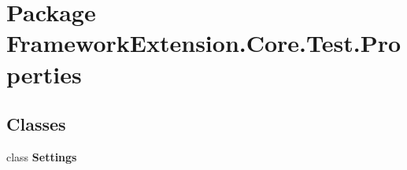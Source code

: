 \hypertarget{namespace_framework_extension_1_1_core_1_1_test_1_1_properties}{\section{Package Framework\-Extension.\-Core.\-Test.\-Properties}
\label{namespace_framework_extension_1_1_core_1_1_test_1_1_properties}
}
\subsection*{Classes}
\begin{DoxyCompactItemize}
\item 
class {\bfseries Settings}
\end{DoxyCompactItemize}
